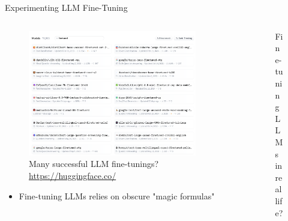 \documentclass[11pt,aspectratio=169]{beamer}
\begin{document}
\begin{frame}{Experimenting LLM Fine-Tuning}
    \begin{columns}
        \renewcommand{\thempfootnote}{}
        \begin{column}{0.5\linewidth}
            \vspace{-0.5cm}
            \begin{figure}
                \centering
                \caption*{\centering Many successful LLM fine-tunings?\\{\small\url{https://huggingface.co/}}}
                \vspace{-0.3cm}
                \includegraphics[width=0.9\textwidth]{finetune_success.png}
            \end{figure}
            \begin{itemize}
                \item {\color{red}} Fine-tuning LLMs relies on obscure "magic formulas"
            \end{itemize}
        \end{column}
        \begin{column}{0.5\linewidth}
            \vspace{-1cm}
            \begin{figure}
                \centering
                \caption*{\centering Fine-tuning LLMs in real life?}

\end{figure}
\end{column}
\end{columns}
\end{frame}
\end{document}
